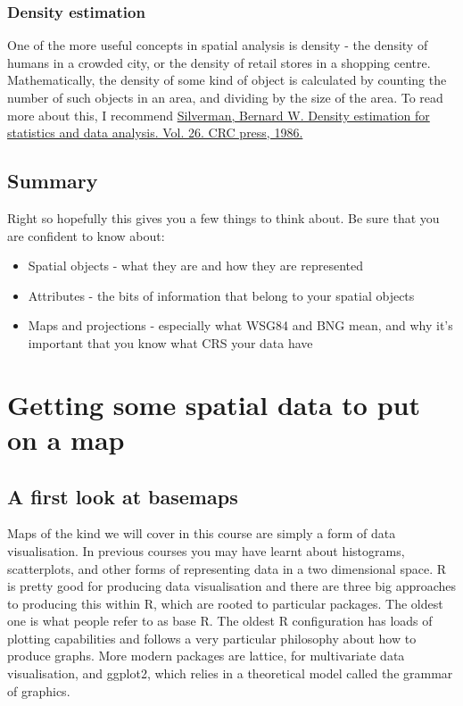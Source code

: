\documentclass[]{book}
\providecommand{\tightlist}{%
  \setlength{\itemsep}{0pt}\setlength{\parskip}{0pt}}
\begin{document}
\hypertarget{density-estimation}{%
\subsubsection{Density estimation}\label{density-estimation}}

One of the more useful concepts in spatial analysis is density - the density of humans in a crowded city, or the density of retail stores in a shopping centre. Mathematically, the density of some kind of object is calculated by counting the number of such objects in an area, and dividing by the size of the area. To read more about this, I recommend \href{https://books.google.co.uk/books?id=e-xsrjsL7WkC\&dq=silverman+density+estimation+for+statistics\&lr=\&source=gbs_navlinks_s}{Silverman, Bernard W. Density estimation for statistics and data analysis. Vol. 26. CRC press, 1986.}

\hypertarget{summary}{%
\subsection{Summary}\label{summary}}

Right so hopefully this gives you a few things to think about. Be sure that you are confident to know about:

\begin{itemize}
\tightlist
\item
  Spatial objects - what they are and how they are represented
\item
  Attributes - the bits of information that belong to your spatial objects
\item
  Maps and projections - especially what WSG84 and BNG mean, and why it's important that you know what CRS your data have
\end{itemize}

\hypertarget{getting-some-spatial-data-to-put-on-a-map}{%
\section{Getting some spatial data to put on a map}\label{getting-some-spatial-data-to-put-on-a-map}}

\hypertarget{a-first-look-at-basemaps}{%
\subsection{A first look at basemaps}\label{a-first-look-at-basemaps}}

Maps of the kind we will cover in this course are simply a form of data visualisation. In previous courses you may have learnt about histograms, scatterplots, and other forms of representing data in a two dimensional space. R is pretty good for producing data visualisation and there are three big approaches to producing this within R, which are rooted to particular packages. The oldest one is what people refer to as base R. The oldest R configuration has loads of plotting capabilities and follows a very particular philosophy about how to produce graphs. More modern packages are lattice, for multivariate data visualisation, and ggplot2, which relies in a theoretical model called the grammar of graphics.
\end{document}
